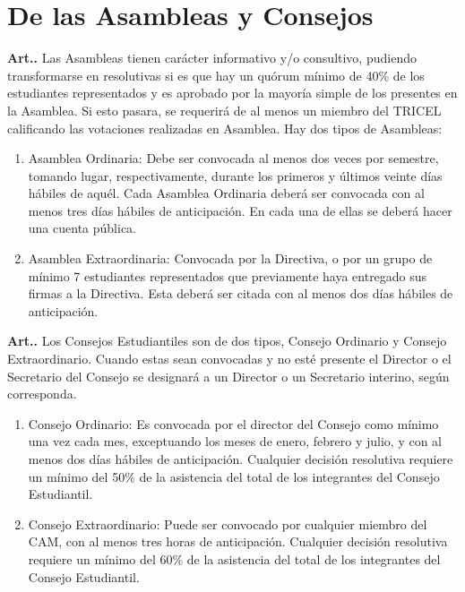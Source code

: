 \documentclass[letterpaper,11pt]{article}
\newcounter{art}
\newenvironment{art}{\refstepcounter{art}\textbf{Art.{\space}\theart.}}{}
\begin{document}
\section{De las Asambleas y Consejos}\label{asambleasConsejos}
\begin{art}\label{asambleas}
    Las Asambleas tienen carácter informativo y/o consultivo, pudiendo transformarse en resolutivas si es que hay un quórum mínimo de 40\% de los estudiantes representados y es aprobado por la mayoría simple de los presentes en la Asamblea. Si esto pasara, se requerirá de al menos un miembro del TRICEL calificando las votaciones realizadas en Asamblea. Hay dos tipos de Asambleas:
    \begin{enumerate}
        \item Asamblea Ordinaria: Debe ser convocada al menos dos veces por semestre, tomando lugar, respectivamente, durante los primeros y últimos veinte días hábiles de aquél. Cada Asamblea Ordinaria deberá ser convocada con al menos tres días hábiles de anticipación. En cada una de ellas se deberá hacer una cuenta pública.
        \item Asamblea Extraordinaria: Convocada por la Directiva, o por un grupo de mínimo 7 estudiantes representados que previamente haya entregado sus firmas a la Directiva. Esta deberá ser citada con al menos dos días hábiles de anticipación.
    \end{enumerate}
\end{art}

\begin{art}\label{consejos}
    Los Consejos Estudiantiles son de dos tipos, Consejo Ordinario y Consejo Extraordinario. Cuando estas sean convocadas y no esté presente el Director o el Secretario del Consejo se designará a un Director o un Secretario interino, según corresponda.
    \begin{enumerate}
        \item Consejo Ordinario: Es convocada por el director del Consejo como mínimo una vez cada mes, exceptuando los meses de enero, febrero y julio, y con al menos dos días hábiles de anticipación. Cualquier decisión resolutiva requiere un mínimo del 50\% de la asistencia del total de los integrantes del Consejo Estudiantil.
        \item Consejo Extraordinario: Puede ser convocado por cualquier miembro del CAM, con al menos tres horas de anticipación. Cualquier decisión resolutiva requiere un mínimo del 60\% de la asistencia del total de los integrantes del Consejo Estudiantil.
    \end{enumerate}
\end{art}
\end{document}
